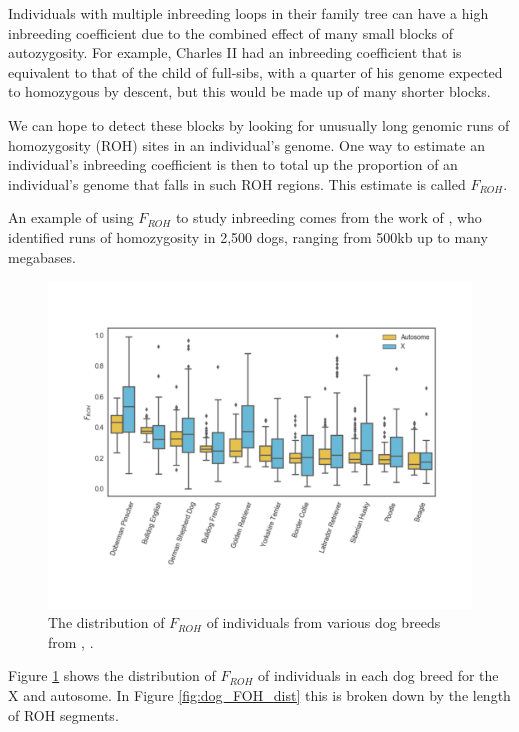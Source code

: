 {{Individuals with multiple inbreeding loops in their family tree can
have a high inbreeding coefficient due to
the combined effect of many small blocks of autozygosity. For example, Charles II had
an inbreeding coefficient that is equivalent to that of the child of
full-sibs, with a quarter of his genome expected to homozygous by
descent, but this would be made up of many shorter blocks.

We can hope to detect these blocks by looking for unusually long
genomic runs of homozygosity (ROH) sites in an individual's genome. One way to
estimate an individual's inbreeding coefficient is then to total up
the proportion of an individual's genome that falls in such ROH
regions. This estimate is called $F_{ROH}$.

An example of using $F_{ROH}$ to study inbreeding comes from the work of
\citet{sams2018fine}, who identified runs of homozygosity in 2,500 dogs,
ranging from 500kb up to many megabases.
  \begin{figure}
  \begin{center}
    \includegraphics[width= \textwidth]{figures/sharing_relatives/dogs_FROH.pdf}
\end{center}
\caption{The distribution  of $F_{ROH}$ of individuals from various
  dog breeds from \citet{Sams:18}, \PLOSccBY.} \label{fig:dog_FOH}
\end{figure}
Figure
\ref{fig:dog_FOH} shows the distribution of $F_{ROH}$ of individuals in each dog
breed for the X and autosome. In Figure \ref{fig:dog_FOH_dist} this is
broken down by the length of ROH segments.

}}
